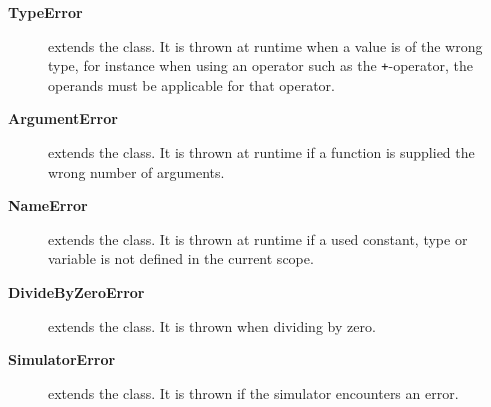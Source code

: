\begin{description}
\item[\textbf{TypeError}] extends the  class. It is
  thrown at runtime when a value is of the wrong type, for instance when using
  an operator such as the \texttt{+}-operator, the operands must be applicable
  for that operator.

\item[\textbf{ArgumentError}] extends the  class. It is
  thrown at runtime if a function is supplied the wrong number of arguments.

\item[\textbf{NameError}] extends the  class. It is
  thrown at runtime if a used constant, type or variable is not defined in the current scope.

\item[\textbf{DivideByZeroError}] extends the  class. It
  is thrown when dividing by zero.

\item[\textbf{SimulatorError}] extends the  class. It is thrown
  if the simulator encounters an error.
\end{description}

